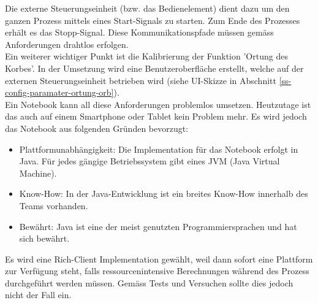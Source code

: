 Die externe Steuerungseinheit (bzw. das Bedienelement) dient dazu um den ganzen Prozess mittels eines Start-Signals zu starten. Zum Ende des Prozesses erhält es das Stopp-Signal. Diese Kommunikationspfade müssen gemäss Anforderungen drahtlos erfolgen. \\
Ein weiterer wichtiger Punkt ist die Kalibrierung der Funktion 'Ortung des Korbes'. In der Umsetzung wird eine Benutzeroberfläche erstellt, welche auf der externen Steuerungseinheit betrieben wird (siehe UI-Skizze in Abschnitt \ref{ss-config-paramater-ortung-orb}).\\
Ein Notebook kann all diese Anforderungen problemlos umsetzen. Heutzutage ist das auch auf einem Smartphone oder Tablet kein Problem mehr. Es wird jedoch das Notebook aus folgenden Gründen bevorzugt:

\begin{itemize}
	\item Plattformunabhängigkeit: Die Implementation für das Notebook erfolgt in Java. Für jedes gängige Betriebssystem gibt eines JVM (Java Virtual Machine).
	\item Know-How: In der Java-Entwicklung ist ein breites Know-How innerhalb des Teams vorhanden.
	\item Bewährt: Java ist eine der meist genutzten Programmiersprachen und hat sich bewährt.
\end{itemize}

Es wird eine Rich-Client Implementation gewählt, weil dann sofort eine Plattform zur Verfügung steht, falls ressourcenintensive Berechnungen während des Prozess durchgeführt werden müssen. Gemäss Tests und Versuchen sollte dies jedoch nicht der Fall ein.



